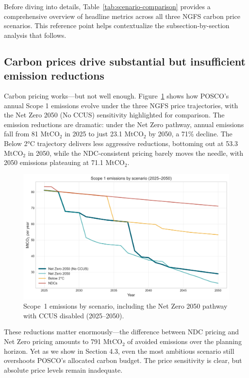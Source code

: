 \documentclass[preprint,1p,authoryear]{elsarticle}
\begin{document}
Before diving into details, Table~\ref{tab:scenario-comparison} provides a comprehensive overview of headline metrics across all three NGFS carbon price scenarios. This reference point helps contextualize the subsection-by-section analysis that follows.

\subsection{Carbon prices drive substantial but insufficient emission reductions}

Carbon pricing works—but not well enough. Figure~\ref{fig:scope1-by-scenario} shows how POSCO's annual Scope 1 emissions evolve under the three NGFS price trajectories, with the Net Zero 2050 (No CCUS) sensitivity highlighted for comparison. The emission reductions are dramatic: under the Net Zero pathway, annual emissions fall from 81 MtCO$_2$ in 2025 to just 23.1 MtCO$_2$ by 2050, a 71\% decline. The Below 2°C trajectory delivers less aggressive reductions, bottoming out at 53.3 MtCO$_2$ in 2050, while the NDC-consistent pricing barely moves the needle, with 2050 emissions plateauing at 71.1 MtCO$_2$.

\begin{figure}[!t]
  \centering
  \includegraphics[width=0.8\linewidth]{scope1_by_scenario}
  \caption{Scope~1 emissions by scenario, including the Net Zero 2050 pathway with CCUS disabled (2025--2050).}
  \label{fig:scope1-by-scenario}
\end{figure}

These reductions matter enormously—the difference between NDC pricing and Net Zero pricing amounts to 791 MtCO$_2$ of avoided emissions over the planning horizon. Yet as we show in Section 4.3, even the most ambitious scenario still overshoots POSCO's allocated carbon budget. The price sensitivity is clear, but absolute price levels remain inadequate.
\end{document}
